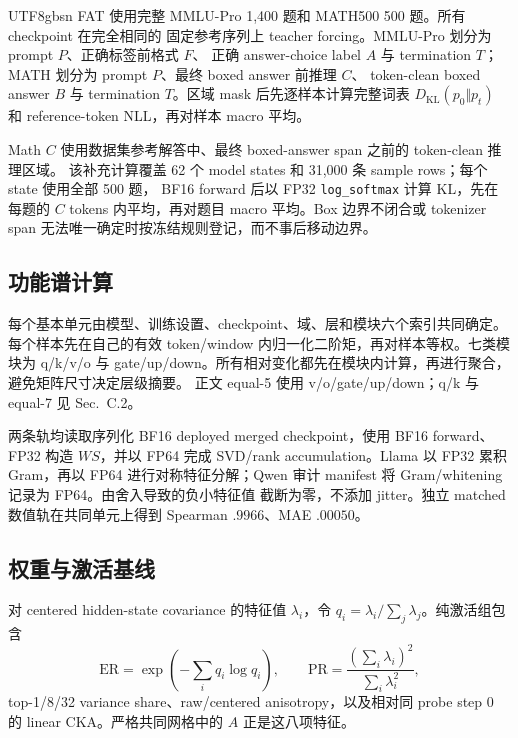 \documentclass[letterpaper]{article} %
\begin{document}
\begin{CJK*}{UTF8}{gbsn}
FAT 使用完整 MMLU-Pro 1,400 题和 MATH500 500 题。所有 checkpoint 在完全相同的
固定参考序列上 teacher forcing。MMLU-Pro 划分为 prompt $P$、正确标签前格式 $F$、
正确 answer-choice label $A$ 与 termination $T$；MATH 划分为 prompt $P$、最终 boxed answer 前推理 $C$、
token-clean boxed answer $B$ 与 termination $T$。区域 mask 后先逐样本计算完整词表
$D_{\mathrm{KL}}(p_0\Vert p_t)$ 和 reference-token NLL，再对样本 macro 平均。

Math $C$ 使用数据集参考解答中、最终 boxed-answer span 之前的 token-clean 推理区域。
该补充计算覆盖 62 个 model states 和 31,000 条 sample rows；每个 state 使用全部 500 题，
BF16 forward 后以 FP32 \texttt{log\_softmax} 计算 KL，先在每题的 $C$ tokens 内平均，再对题目
macro 平均。Box 边界不闭合或 tokenizer span 无法唯一确定时按冻结规则登记，而不事后移动边界。

\subsection{功能谱计算}

每个基本单元由模型、训练设置、checkpoint、域、层和模块六个索引共同确定。
每个样本先在自己的有效 token/window 内归一化二阶矩，再对样本等权。七类模块为
q/k/v/o 与 gate/up/down。所有相对变化都先在模块内计算，再进行聚合，避免矩阵尺寸决定层级摘要。
正文 equal-5 使用 v/o/gate/up/down；q/k 与 equal-7 见 Sec.~C.2。

两条轨均读取序列化 BF16 deployed merged checkpoint，使用 BF16 forward、FP32 构造
$WS$，并以 FP64 完成 SVD/rank accumulation。Llama 以 FP32 累积 Gram，再以 FP64
进行对称特征分解；Qwen 审计 manifest 将 Gram/whitening 记录为 FP64。由舍入导致的负小特征值
截断为零，不添加 jitter。独立 matched 数值轨在共同单元上得到
Spearman $.9966$、MAE $.00050$。

\subsection{权重与激活基线}

对 centered hidden-state covariance 的特征值 $\lambda_i$，令
$q_i=\lambda_i/\sum_j\lambda_j$。纯激活组包含
\begin{equation}
\mathrm{ER}=\exp\!\left(-\sum_iq_i\log q_i\right),\qquad
\mathrm{PR}=\frac{(\sum_i\lambda_i)^2}{\sum_i\lambda_i^2},
\end{equation}
top-1/8/32 variance share、raw/centered anisotropy，以及相对同 probe step 0 的
linear CKA。严格共同网格中的 $A$ 正是这八项特征。


\end{CJK*}
\end{document}
